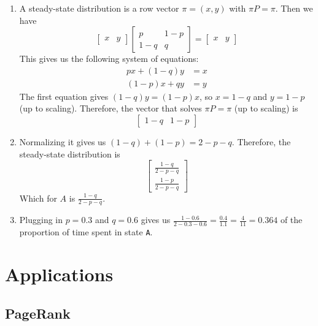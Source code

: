 \begin{Answer}[ref={ex:transition_eigen}]

    \begin{enumerate}
        \item A steady-state distribution is a row vector $\pi = (x, y)$ with $\pi P = \pi$. Then we have
              $$\begin{bmatrix} x & y \end{bmatrix}
                  \begin{bmatrix}
                      p & 1-p \\ 1-q & q
                  \end{bmatrix}
                  =
                  \begin{bmatrix} x & y \end{bmatrix}$$
              This gives us the following system of equations:
              \begin{align*}
                  px+(1-q)y & =x \\
                  (1-p)x+qy & =y
              \end{align*}
              The first equation gives $(1-q)y = (1-p)x$, so $x = 1-q$ and $y = 1-p$ (up to scaling).
              Therefore, the vector that solves $\pi P = \pi$ (up to scaling) is
              $$\begin{bmatrix} 1-q & 1-p \end{bmatrix}$$

        \item Normalizing it gives us $(1-q)+(1-p)=2-p-q$. Therefore, the steady-state distribution is
              $$\begin{bmatrix}
                      \frac{1-q}{2-p-q} \\
                      \frac{1-p}{2-p-q}
                  \end{bmatrix}$$
              Which for $A$ is $\frac{1-q}{2-p-q}$.
        \item Plugging in $p=0.3$ and $q=0.6$ gives us $\frac{1-0.6}{2-0.3-0.6}=\frac{0.4}{1.1}=\frac{4}{11} = 0.364$ of the proportion of time spent in state \texttt{A}.
    \end{enumerate}

\end{Answer}
\section{Applications}
\subsection{PageRank}

